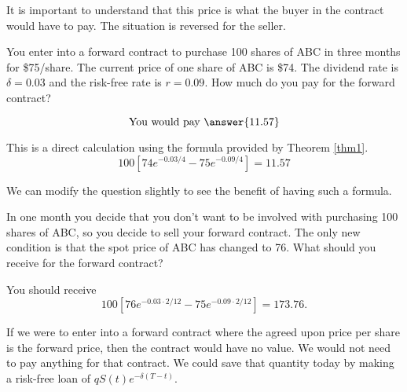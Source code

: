\documentclass{ximera}
\begin{document}
\begin{remark}
It is important to understand that this price is what the buyer in the contract would have to pay. The situation is reversed for the seller.
\end{remark}

\begin{question}
You enter into a forward contract to purchase 100 shares of ABC in three months for \$75/share. The current price of one share of ABC is \$74. The dividend rate is $\delta=0.03$ and the risk-free rate is $r=0.09$. How much do you pay for the forward contract?
	\begin{prompt}
		\begin{equation*}
		\text{You would pay }\answer{11.57}
		\end{equation*}
	\end{prompt}
\end{question}

\begin{solution}
	This is a direct calculation using the formula provided by Theorem \ref{thm1}. 
	\begin{equation*}
	100[74e^{-0.03/4}-75e^{-0.09/4}]=11.57
	\end{equation*}
\end{solution}	

We can modify the question slightly to see the benefit of having such a formula.

\begin{example}
In one month you decide that you don't want to be involved with purchasing 100 shares of ABC, so you decide to sell your forward contract. The only new condition is that the spot price of ABC has changed to 76. What should you receive for the forward contract?
\end{example}

\begin{solution}	
You should receive
	\begin{equation*}
	100[76e^{-0.03\cdot 2/12}-75e^{-0.09\cdot 2/12}]=173.76.
	\end{equation*}
\end{solution}

\begin{remark}
If we were to enter into a forward contract where the agreed upon price per share is the forward price, then the contract would have no value. We would not need to pay anything for that contract. We could save that quantity today by making a risk-free loan of $qS(t)e^{-\delta (T-t)}$. 
\end{remark}
\end{document}
